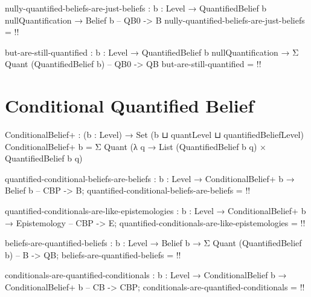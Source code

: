 \documentclass{article}
\begin{document}
\begin{code}
nully-quantified-beliefs-are-just-beliefs :
  {b : Level} → QuantifiedBelief b nullQuantification → Belief b -- QB0 -> B
nully-quantified-beliefs-are-just-beliefs = {!!}
\end{code}

\begin{code}
but-are-still-quantified :
  {b : Level} →
  QuantifiedBelief b nullQuantification →
  Σ Quant (QuantifiedBelief b) -- QB0 -> QB
but-are-still-quantified = {!!}
\end{code}

\section{Conditional Quantified Belief}

\begin{code}
ConditionalBelief+ : (b : Level) → Set (b ⊔ quantLevel ⊔ quantifiedBeliefLevel)
ConditionalBelief+ b = Σ Quant (λ q → List (QuantifiedBelief b q)
                                    × QuantifiedBelief b q)
\end{code}

\begin{code}
quantified-conditional-beliefs-are-beliefs :
  {b : Level} → ConditionalBelief+ b → Belief b -- CBP -> B;
quantified-conditional-beliefs-are-beliefs = {!!}
\end{code}

\begin{code}
quantified-conditionals-are-like-epistemologies :
  {b : Level} → ConditionalBelief+ b → Epistemology -- CBP -> E;
quantified-conditionals-are-like-epistemologies = {!!}
\end{code}

\begin{code}
beliefs-are-quantified-beliefs :
  {b : Level} → Belief b → Σ Quant (QuantifiedBelief b) -- B -> QB;
beliefs-are-quantified-beliefs = {!!}
\end{code}

\begin{code}
conditionals-are-quantified-conditionals :
  {b : Level} → ConditionalBelief b → ConditionalBelief+ b -- CB -> CBP;
conditionals-are-quantified-conditionals = {!!}
\end{code}
\end{document}
